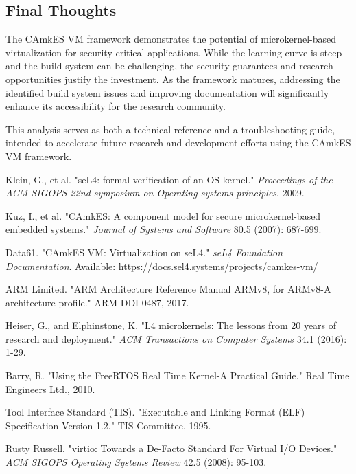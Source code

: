 \documentclass[11pt,a4paper]{article}
\begin{document}
\subsection{Final Thoughts}

The CAmkES VM framework demonstrates the potential of microkernel-based virtualization for security-critical applications. While the learning curve is steep and the build system can be challenging, the security guarantees and research opportunities justify the investment. As the framework matures, addressing the identified build system issues and improving documentation will significantly enhance its accessibility for the research community.

This analysis serves as both a technical reference and a troubleshooting guide, intended to accelerate future research and development efforts using the CAmkES VM framework.


\begin{thebibliography}{99}

Klein, G., et al. "seL4: formal verification of an OS kernel." 
\textit{Proceedings of the ACM SIGOPS 22nd symposium on Operating systems principles}. 2009.

Kuz, I., et al. "CAmkES: A component model for secure microkernel-based embedded systems." 
\textit{Journal of Systems and Software} 80.5 (2007): 687-699.

Data61. "CAmkES VM: Virtualization on seL4."
\textit{seL4 Foundation Documentation}. Available: https://docs.sel4.systems/projects/camkes-vm/

ARM Limited. "ARM Architecture Reference Manual ARMv8, for ARMv8-A architecture profile." 
ARM DDI 0487, 2017.

Heiser, G., and Elphinstone, K. "L4 microkernels: The lessons from 20 years of research and deployment." 
\textit{ACM Transactions on Computer Systems} 34.1 (2016): 1-29.

Barry, R. "Using the FreeRTOS Real Time Kernel-A Practical Guide." 
Real Time Engineers Ltd., 2010.

Tool Interface Standard (TIS). "Executable and Linking Format (ELF) Specification Version 1.2." 
TIS Committee, 1995.

Rusty Russell. "virtio: Towards a De-Facto Standard For Virtual I/O Devices." 
\textit{ACM SIGOPS Operating Systems Review} 42.5 (2008): 95-103.

\end{thebibliography}
\end{document}
